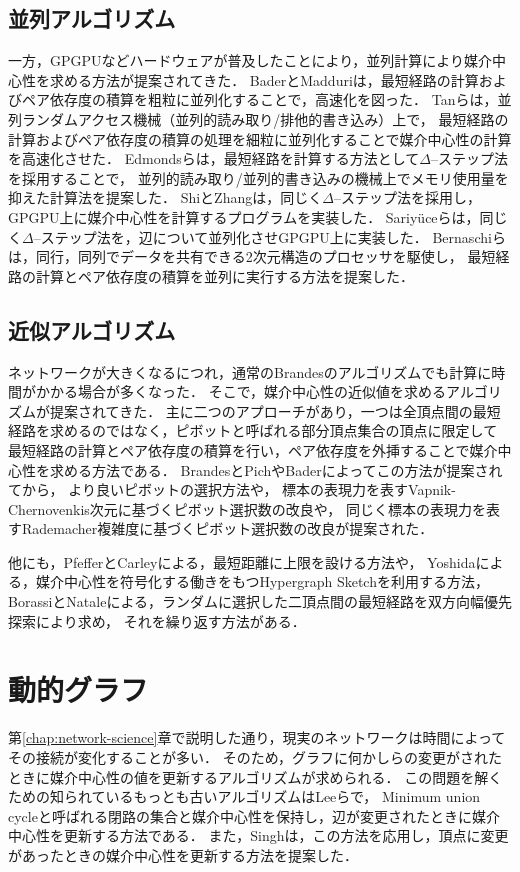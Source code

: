 \subsection{並列アルゴリズム}
一方，GPGPUなどハードウェアが普及したことにより，並列計算により媒介中心性を求める方法が提案されてきた．
BaderとMadduri\cite{Bader2006}は，最短経路の計算およびペア依存度の積算を粗粒に並列化することで，高速化を図った．
Tanら\cite{Tan2009}は，並列ランダムアクセス機械（並列的読み取り/排他的書き込み）上で，
最短経路の計算およびペア依存度の積算の処理を細粒に並列化することで媒介中心性の計算を高速化させた．
Edmondsら\cite{Edmonds2010}は，最短経路を計算する方法として$\Delta$--ステップ法を採用することで，
並列的読み取り/並列的書き込みの機械上でメモリ使用量を抑えた計算法を提案した．
ShiとZhang\cite{Shi2011}は，同じく$\Delta$--ステップ法を採用し，GPGPU上に媒介中心性を計算するプログラムを実装した．
Sariy{\"{u}}ceら\cite{Sariyuce2013}は，同じく$\Delta$--ステップ法を，辺について並列化させGPGPU上に実装した．
Bernaschiら\cite{Bernaschi2016}は，同行，同列でデータを共有できる2次元構造のプロセッサを駆使し，
最短経路の計算とペア依存度の積算を並列に実行する方法を提案した．

\subsection{近似アルゴリズム}
ネットワークが大きくなるにつれ，通常のBrandesのアルゴリズムでも計算に時間がかかる場合が多くなった．
そこで，媒介中心性の近似値を求めるアルゴリズムが提案されてきた．
主に二つのアプローチがあり，一つは全頂点間の最短経路を求めるのではなく，ピボットと呼ばれる部分頂点集合の頂点に限定して
最短経路の計算とペア依存度の積算を行い，ペア依存度を外挿することで媒介中心性を求める方法である\cite{Brandes2007}．
BrandesとPich\cite{Brandes2007}やBader\cite{Bader2007}によってこの方法が提案されてから，
より良いピボットの選択方法\cite{Geisberger2008,Chehreghani2014}や，
標本の表現力を表すVapnik-Chernovenkis次元に基づくピボット選択数の改良\cite{Riondato2014}や，
同じく標本の表現力を表すRademacher複雑度に基づくピボット選択数の改良\cite{Riondato2016}が提案された．

他にも，PfefferとCarleyによる，最短距離に上限を設ける方法\cite{Pfeffer2012}や，
Yoshidaによる，媒介中心性を符号化する働きをもつHypergraph Sketchを利用する方法\cite{Yoshida2014}，
BorassiとNataleによる，ランダムに選択した二頂点間の最短経路を双方向幅優先探索により求め，
それを繰り返す方法\cite{Borassi2019}がある．

\section{動的グラフ}
第\ref{chap:network-science}章で説明した通り，現実のネットワークは時間によってその接続が変化することが多い．
そのため，グラフに何かしらの変更がされたときに媒介中心性の値を更新するアルゴリズムが求められる．
この問題を解くための知られているもっとも古いアルゴリズムはLeeら\cite{Lee2012}で，
Minimum union cycleと呼ばれる閉路の集合と媒介中心性を保持し，辺が変更されたときに媒介中心性を更新する方法である．
また，Singh\cite{Singh2015}は，この方法を応用し，頂点に変更があったときの媒介中心性を更新する方法を提案した．

